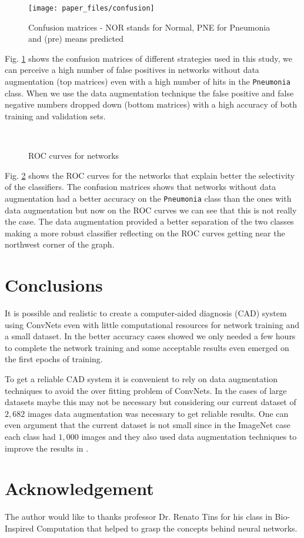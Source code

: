 \documentclass[twocolumn]{article}
\newcommand{\tamfig}{0.9}
\newcommand{\tammeiafig}{0.45}
\newcommand{\mycite}{\cite}
\begin{document}
\begin{figure}[h]
\texttt{[image: paper\_files/confusion]}
\caption[Confusion matrices]{Confusion matrices - NOR stands for Normal, PNE for Pneumonia and (pre) means predicted}
\label{grafico_confusao}
\end{figure}

Fig. \ref{grafico_confusao} shows the confusion matrices of different strategies used in this study, we can perceive a high number of false positives in networks without data augmentation (top matrices) even with a high number of hits in the \texttt{Pneumonia} class. When we use the data augmentation technique the false positive and false negative numbers dropped down (bottom matrices) with a high accuracy of both training and validation sets.

\begin{figure}[h]
\\
\caption{ROC curves for networks}
\label{grafico_roc}
\end{figure}

Fig. \ref{grafico_roc} shows the ROC curves for the networks that explain better the selectivity  of the classifiers. The confusion matrices shows that networks without data augmentation had a better accuracy on the \texttt{Pneumonia} class than the ones with data augmentation but now on the ROC curves we can see that this is not really the case. The data augmentation provided a better separation of the two classes making a more robust classifier reflecting on the ROC curves getting near the northwest corner of the graph.


\section{Conclusions}
It is possible and realistic to create a computer-aided diagnosis (CAD) system using ConvNets even with little computational resources for network training and a small dataset. In the better accuracy cases showed we only needed a few hours to complete the network training and some acceptable results even emerged on the first epochs of training.

To get a reliable CAD system it is convenient to rely on data augmentation techniques to avoid the over fitting problem of ConvNets. In the cases of large datasets maybe this may not be necessary but considering our current dataset of $2,682$ images data augmentation was necessary to get reliable results. One can even argument that the current dataset is not small since in the ImageNet case each class had $1,000$ images and they also used data augmentation techniques to improve the results in \mycite{ImageNet}.
\section*{Acknowledgement}
The author would like to thanks professor Dr. Renato Tins for his class in Bio-Inspired Computation that helped to grasp the concepts behind neural networks.

\printbibliography
\end{document}
